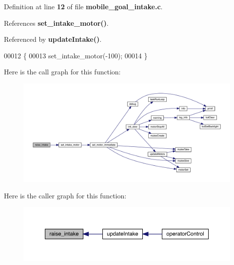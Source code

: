Definition at line \textbf{ 12} of file \textbf{ mobile\+\_\+goal\+\_\+intake.\+c}.



References \textbf{ set\+\_\+intake\+\_\+motor()}.



Referenced by \textbf{ update\+Intake()}.


\begin{DoxyCode}
00012                            \{
00013   set_intake_motor(-100);
00014 \}
\end{DoxyCode}
Here is the call graph for this function\+:\nopagebreak
\begin{figure}[H]
\begin{center}
\leavevmode
\includegraphics[width=350pt]{mobile__goal__intake_8c_a4899f9a8621015313e6312ce085da979_cgraph}
\end{center}
\end{figure}
Here is the caller graph for this function\+:\nopagebreak
\begin{figure}[H]
\begin{center}
\leavevmode
\includegraphics[width=350pt]{mobile__goal__intake_8c_a4899f9a8621015313e6312ce085da979_icgraph}
\end{center}
\end{figure}
\mbox{\label{mobile__goal__intake_8c_a8f215023832ba515d7b4535e3ae07498}} 
